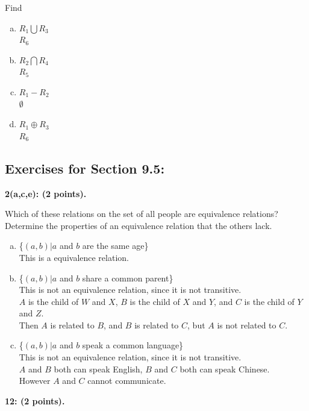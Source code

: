 \documentclass[12pt]{article}  %
\begin{document}
\noindent
Find
\begin{enumerate}[a)]
    \item $R_1\bigcup R_3$\\
    $R_6$
    \setcounter{enumi}{2}
    \item $R_2\bigcap R_4$\\
    $R_5$
    \setcounter{enumi}{4}
    \item $R_1-R_2$\\
    $\emptyset$
    \setcounter{enumi}{6}
    \item $R_1\oplus R_3$\\
    $R_6$
\end{enumerate}

\clearpage
\subsection*{Exercises for Section 9.5:}     

\noindent
{\bf 2(a,c,e): (2 points).}

\noindent
Which of these relations on the set of all people are equivalence relations? Determine the properties of an equivalence relation that the others lack.
\begin{enumerate}[a)]
    \item \{$(a,b)\vert a$ and $b$ are the same age\}\\
    This is a equivalence relation.
    \setcounter{enumi}{2}
    \item \{$(a,b)\vert a$ and $b$ share a common parent\}\\
    This is not an equivalence relation, since it is not transitive.\\
    $A$ is the child of $W$ and $X$, $B$ is the child of $X$ and $Y$, and $C$ is the child of $Y$ and $Z$.\\
    Then $A$ is related to $B$, and $B$ is related to $C$, but $A$ is not related to $C$.
    \setcounter{enumi}{4}
    \item \{$(a,b)\vert a$ and $b$ speak a common language\}\\
    This is not an equivalence relation, since it is not transitive.\\
    $A$ and $B$ both can speak English, $B$ and $C$ both can speak Chinese.\\
    However $A$ and $C$ cannot communicate.

\end{enumerate}

\noindent
{\bf 12: (2 points).}
\end{document}
